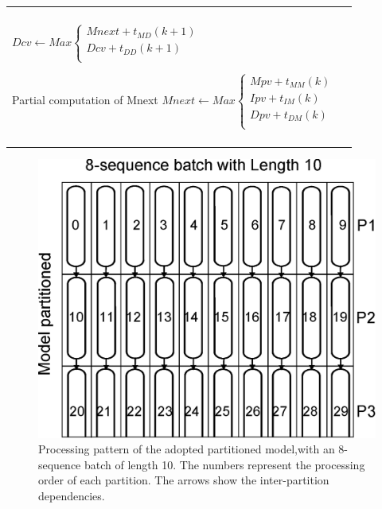 \begin {itemize}
\begin{table}[htb!]
\begin{tabularx}{\textwidth}{ |X|X| }
\begin{algorithmic}
		\State $ Imx(k) \gets Max
					\begin{cases}
						Mpv+  t_{MI}(k+1)	\\
						Ipv +  t_{II}(k+1)	\\
					\end{cases} $ \\
		\State $ Dcv \gets Max
					\begin{cases}
						Mnext +  t_{MD}(k+1)	\\
						Dcv +  t_{DD}(k+1)	\\
					\end{cases} $ 

		\LeftComment Partial computation of Mnext
		\State $ Mnext \gets  Max
					\begin{cases}
						Mpv + t_{MM}(k)	\\
						Ipv  + t_{IM}(k)	\\
						Dpv + t_{DM}(k)	\\
					\end{cases} $ \\
	\EndFor
\end{algorithmic}
\\ \hline
\end{tabularx}
\end{table}

\end {itemize}


\begin{figure}[htb!]
	\centering
	\includegraphics[scale=0.56]{img/partitions.eps} 
	\caption[Processing order in a partitioned model] {Processing pattern of the adopted partitioned model,with an 8-sequence batch of length 10. The numbers represent the processing order of each partition. The arrows show the inter-partition dependencies.}
	\label{figure-partitions}
\end{figure}

